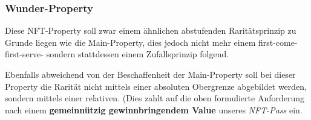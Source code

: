 
\subsubsection{Wunder-Property}
\label{sec:hologramm}

\vspace{0.3cm}

Diese NFT-Property soll zwar einem ähnlichen abstufenden Raritätsprinzip zu Grunde liegen wie die Main-Property, dies jedoch nicht mehr einem first-come-first-serve- sondern stattdessen einem Zufallsprinzip folgend.

Ebenfalls abweichend von der Beschaffenheit der Main-Property soll bei dieser Pro\-perty die Rarität nicht mittels einer absoluten Obergrenze abgebildet werden, sondern mittels einer relativen. (Dies zahlt auf die oben formulierte Anforderung nach einem \textbf{gemeinnützig gewinnbringendem Value} unseres \textit{NFT-Pass} ein.

\vspace{0.3cm}

